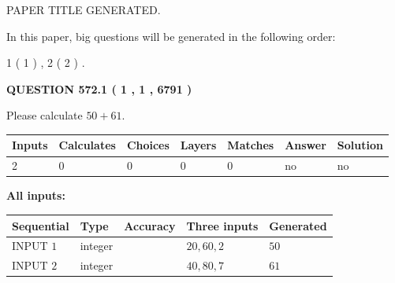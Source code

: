 \documentclass[12pt]{article}
\begin{document}
   
\vspace{0.2in}
   
   
   
   
   
   
   
   
 \vspace{0.2in}
 
 
 
 
   
   
 PAPER TITLE GENERATED.
   
   
   
\vspace{0.2in}
   
In this paper, big questions will be generated in the following order: 
   
   
   1 ( 1 )
 ,
   2 ( 2 )
 .
  
\vspace{0.2in}
  
{\textbf{\Large{QUESTION
572.1 
 ( 1 , 1 , 6791 )
}}}
  
  
 
Please calculate $ %
50 +  %
61 $.
 
 
   
   
   
   
\noindent\begin{tabular}{|l|l|l|l|l|l|l|}
 \hline
Inputs & Calculates & Choices & Layers & Matches & Answer & Solution \\ \hline
 2  & 
 0  & 
 0
  & 
 0  & 
 0  & 
  no & 
  no 
  \\ \hline
 \end{tabular}
   
   
   
   
\noindent{}
   
   
   
   
\noindent\vspace{0.1in}\hspace{-0.08in} {\textbf{\Large{All inputs: }}}
   
   
  
  
\noindent\begin{tabular}{|l|l|l|l|l|}
\hline
 Sequential & Type & Accuracy & Three inputs & Generated \\ 
\hline
 
 
  INPUT $  1 $ & integer &  & $
 20
 , 
 60
 , 
 2
 $ & $ 50 $ 
 \\  \hline  
 
 
  INPUT $  2 $ & integer &  & $
 40
 , 
 80
 , 
 7
 $ & $ 61 $ 
 \\  \hline  
 \end{tabular}
   
\end{document}
